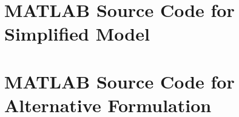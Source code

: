 \documentclass[12pt]{article}
\begin{document}
\pagebreak
{}


\pagebreak
\appendix
\section{MATLAB Source Code for Simplified Model}
\label{app:simple}

\pagebreak
\section{MATLAB Source Code for Alternative Formulation}
\label{app:alternative}

\end{document}
